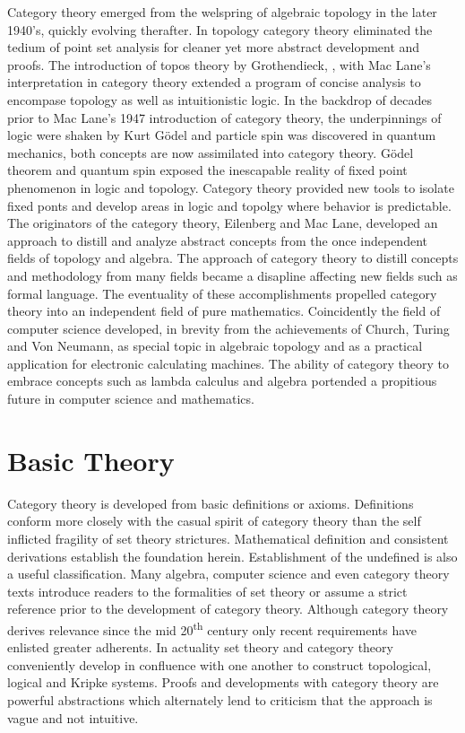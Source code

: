 \documentclass[aps,twocolumn,secnumarabic,nobalancelastpage,amsmath,amssymb,
amsthm,nofootinbib,parskip=full]{revtex4}
\numberwithin{equation}{section}
\begin{document}
Category theory emerged from the welspring of algebraic topology
in the later 1940's, quickly evolving therafter.
In topology category theory eliminated the tedium of point set
analysis for cleaner yet more abstract development and proofs.
The introduction of topos theory by Grothendieck,
\cite{grothendieck1957}, with Mac Lane's interpretation in
category theory extended a program of concise analysis to
encompase topology as well as intuitionistic logic.
In the backdrop of decades prior to Mac Lane's 1947 introduction
of category theory, the underpinnings of logic were
shaken by Kurt G\"{o}del and particle spin was discovered in quantum
mechanics, both concepts are now assimilated into category theory.
G\"{o}del theorem and quantum spin exposed the inescapable
reality of fixed point phenomenon in logic and topology.
Category theory provided new tools to isolate fixed ponts
and develop areas in logic and topolgy where behavior
is predictable.
The originators of the category theory,
Eilenberg and Mac Lane,
developed an approach to distill
and analyze abstract concepts from the once independent fields
of topology and algebra. The approach of category theory
to distill concepts and methodology from many fields became
a disapline affecting new fields such as formal language.
The eventuality of these accomplishments propelled
category theory into an independent
field of pure mathematics.
Coincidently the field of computer science developed,
in brevity from the achievements of Church, Turing and Von Neumann,
as special topic in algebraic topology and as a practical
application for electronic calculating machines.
The ability of category theory to embrace concepts
such as lambda calculus and algebra portended a propitious
future in computer science and mathematics.

\section{Basic Theory}

Category theory is developed from basic definitions or axioms.
Definitions conform more closely with the casual spirit
of category theory than the self inflicted fragility of
set theory strictures. Mathematical
definition and consistent derivations establish the foundation
herein. Establishment of the undefined is also a useful classification.
Many algebra, computer science and
even category theory texts introduce readers to the
formalities of set theory or assume a strict reference
prior to the development of category theory.
Although category theory derives relevance since the
mid 20\textsuperscript{th} century only recent
requirements have enlisted greater adherents.
In actuality set theory and category theory conveniently
develop in confluence with one another to construct
topological, logical and Kripke systems.
Proofs and developments with category theory are powerful
abstractions which alternately lend to criticism
that the approach is vague and not intuitive.
\end{document}
